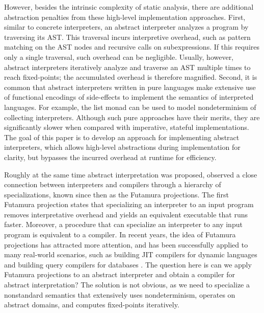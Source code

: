 However, besides the intrinsic complexity of static analysis, there are
additional abstraction penalties from these high-level implementation
approaches. First, similar to concrete interpreters, an abstract interpreter
analyzes a program by traversing its AST. This traversal incurs interpretive
overhead, such as pattern matching on the AST nodes and recursive calls on
subexpressions. If this requires only a single traversal, such overhead can be
negligible. Usually, however, abstract interpreters iteratively analyze and
traverse an AST multiple times to reach fixed-points; the accumulated overhead
is therefore magnified.
Second, it is common that abstract interpreters written in pure languages make
extensive use of functional encodings of side-effects to implement the semantics
of interpreted languages. For example, the list monad can be used to model
nondeterminism of collecting interpreters. Although such pure approaches have
their merits, they are significantly slower when compared with imperative,
stateful implementations. The goal of this paper is to develop an approach for
implementing abstract interpreters, which allows high-level abstractions during
implementation for clarity, but bypasses the incurred overhead at runtime for
efficiency.

Roughly at the same time abstract interpretation was proposed,
\citet{futamura1971partial} observed a close connection between interpreters and
compilers through a hierarchy of specializations, known since then as the
Futamura projections. 
The first Futamura projection states that specializing an interpreter to an
input program removes interpretative overhead and yields an equivalent
executable that runs faster. Moreover, a procedure that can specialize an
interpreter to any input program is equivalent to a compiler.
In recent years, the idea of Futamura projections has attracted more attention,
and has been successfully applied to many real-world scenarios, such as
building JIT compilers for dynamic languages
\cite{Bolz:2009:TMP:1565824.1565827, Marr:2015:TVP:2814270.2814275} and building query
compilers for databases \cite{DBLP:conf/sigmod/TahboubER18, DBLP:conf/osdi/EssertelTDBOR18}.
The question here is can we apply Futamura projections to an abstract
interpreter and obtain a compiler for abstract interpretation?
The solution is not obvious, as we need to specialize a nonstandard
semantics that extensively uses nondeterminism, operates on abstract domains,
and computes fixed-points iteratively. 


